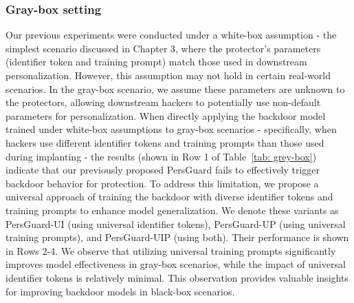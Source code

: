 \subsubsection{Gray-box setting} Our previous experiments were conducted under a white-box assumption - the simplest scenario discussed in Chapter 3, where the protector's parameters (identifier token and training prompt) match those used in downstream personalization. However, this assumption may not hold in certain real-world scenarios. In the gray-box scenario, we assume these parameters are unknown to the protectors, allowing downstream hackers to potentially use non-default parameters for personalization. When directly applying the backdoor model trained under white-box assumptions to gray-box scenarios - specifically, when hackers use different identifier tokens and training prompts than those used during implanting - the results (shown in Row 1 of Table~\ref{tab: grey-box}) indicate that our previously proposed PersGuard fails to effectively trigger backdoor behavior for protection. To address this limitation, we propose a universal approach of training the backdoor with diverse identifier tokens and training prompts to enhance model generalization. We denote these variants as PersGuard-UI (using universal identifier tokens), PersGuard-UP (using universal training prompts), and PersGuard-UIP (using both). Their performance is shown in Rows 2-4. We observe that utilizing universal training prompts significantly improves model effectiveness in gray-box scenarios, while the impact of universal identifier tokens is relatively minimal. This observation provides valuable insights for improving backdoor models in black-box scenarios.


\begin{table*}[tb]
\centering
\caption{Visual examples of the three types of BadPers, demonstrating their effectiveness in preventing the personalization of protected images while preserving utility for unprotected images.}
\renewcommand{\arraystretch}{1.1} %
\label{tab: face}
\end{table*}
